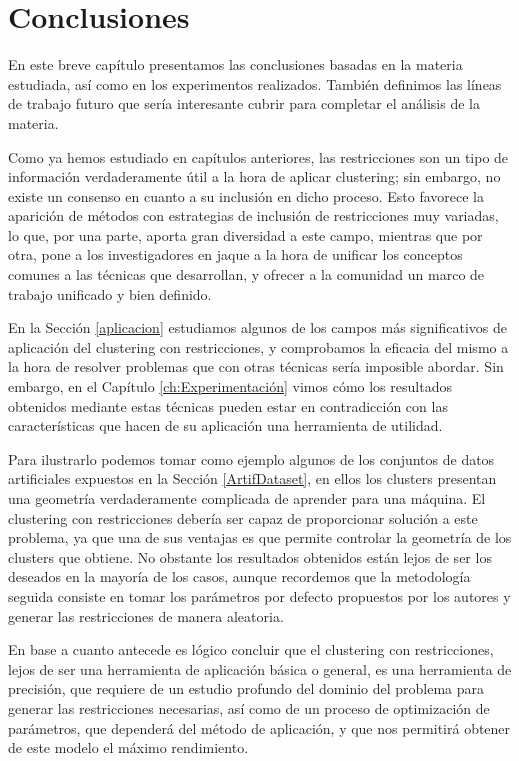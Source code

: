 \chapter{Conclusiones}\label{ch:Conclusiones}

En este breve capítulo presentamos las conclusiones basadas en la materia estudiada, así como en los experimentos realizados. También definimos las líneas de trabajo futuro que sería interesante cubrir para completar el análisis de la materia.

Como ya hemos estudiado en capítulos anteriores, las restricciones son un tipo de información verdaderamente útil a la hora de aplicar clustering; sin embargo, no existe un consenso en cuanto a su inclusión en dicho proceso. Esto favorece la aparición de métodos con estrategias de inclusión de restricciones muy variadas, lo que, por una parte, aporta gran diversidad a este campo, mientras que por otra, pone a los investigadores en jaque a la hora de unificar los conceptos comunes a las técnicas que desarrollan, y ofrecer a la comunidad un marco de trabajo unificado y bien definido.

En la Sección \ref{aplicacion} estudiamos algunos de los campos más significativos de aplicación del clustering con restricciones, y comprobamos la eficacia del mismo a la hora de resolver problemas que con otras técnicas sería imposible abordar. Sin embargo, en el Capítulo \ref{ch:Experimentación} vimos cómo los resultados obtenidos mediante estas técnicas pueden estar en contradicción con las características que hacen de su aplicación una herramienta de utilidad. 

Para ilustrarlo podemos tomar como ejemplo algunos de los conjuntos de datos artificiales expuestos en la Sección \ref{ArtifDataset}, en ellos los clusters presentan una geometría verdaderamente complicada de aprender para una máquina. El clustering con restricciones debería ser capaz de proporcionar solución a este problema, ya que una de sus ventajas es que permite controlar la geometría de los clusters que obtiene. No obstante los resultados obtenidos están lejos de ser los deseados en la mayoría de los casos, aunque recordemos que la metodología seguida consiste en tomar los parámetros por defecto propuestos por los autores y generar las restricciones de manera aleatoria.

En base a cuanto antecede es lógico concluir que el clustering con restricciones, lejos de ser una herramienta de aplicación básica o general, es una herramienta de precisión, que requiere de un estudio profundo del dominio del problema para generar las restricciones necesarias, así como de un proceso de optimización de parámetros, que dependerá del método de aplicación, y que nos permitirá obtener de este modelo el máximo rendimiento.



